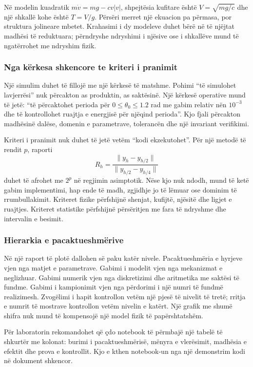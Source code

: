 \documentclass[11pt,oneside,openany]{book}
\begin{document}
Në modelin kuadratik $m\dot v=mg-cv|v|$, shpejtësia kufitare është $V=\sqrt{mg/c}$ dhe një shkallë kohe është $T=V/g$. Përsëri merret një ekuacion pa përmasa, por struktura jolineare mbetet. Krahasimi i dy modeleve duhet bërë në të njëjtat madhësi të reduktuara; përndryshe ndryshimi i njësive ose i shkallëve mund të ngatërrohet me ndryshim fizik.

\subsubsection{Nga kërkesa shkencore te kriteri i pranimit}
Një simulim duhet të fillojë me një kërkesë të matshme. Pohimi ``të simulohet lavjerrësi'' nuk përcakton as produktin, as saktësinë. Një kërkesë operative mund të jetë: ``të përcaktohet perioda për $0\le\theta_0\le1.2$ rad me gabim relativ nën $10^{-3}$ dhe të kontrollohet ruajtja e energjisë për njëqind perioda''. Kjo fjali përcakton madhësinë dalëse, domenin e parametrave, tolerancën dhe një invariant verifikimi.

Kriteri i pranimit nuk duhet të jetë vetëm ``kodi ekzekutohet''. Për një metodë të rendit $p$, raporti
\begin{equation}
 R_h=\frac{\|y_h-y_{h/2}\|}{\|y_{h/2}-y_{h/4}\|}
\end{equation}
duhet të afrohet me $2^p$ në regjimin asimptotik. Nëse kjo nuk ndodh, mund të ketë gabim implementimi, hap ende të madh, zgjidhje jo të lëmuar ose dominim të rrumbullakimit. Kriteret fizike përfshijnë shenjat, kufijtë, njësitë dhe ligjet e ruajtjes. Kriteret statistike përfshijnë përsëritjen me fara të ndryshme dhe intervalin e besimit.

\subsubsection{Hierarkia e pacaktueshmërive}
Në një raport të plotë dallohen së paku katër nivele. Pacaktueshmëria e hyrjeve vjen nga matjet e parametrave. Gabimi i modelit vjen nga mekanizmat e neglizhuar. Gabimi numerik vjen nga diskretizimi dhe aritmetika me saktësi të fundme. Gabimi i kampionimit vjen nga përdorimi i një numri të fundmë realizimesh. Zvogëlimi i hapit kontrollon vetëm një pjesë të nivelit të tretë; rritja e numrit të mostrave kontrollon vetëm nivelin e katërt. Një grafik me shumë shifra nuk mund të kompensojë një model fizik të papërshtatshëm.

Për laboratorin rekomandohet që çdo notebook të përmbajë një tabelë të shkurtër me kolonat: burimi i pacaktueshmërisë, mënyra e vlerësimit, madhësia e efektit dhe prova e kontrollit. Kjo e kthen notebook-un nga një demonstrim kodi në dokument shkencor.
\end{document}
